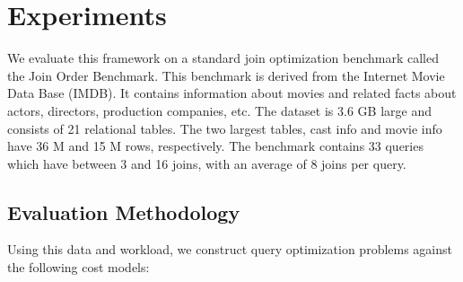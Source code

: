 \section{Experiments}
We evaluate this framework on a standard join optimization benchmark called the Join Order Benchmark. This benchmark is derived from the Internet Movie Data Base
(IMDB). It contains information
about movies and related facts about actors, directors,
production companies, etc. 
The dataset is 3.6 GB large and consists of 21 relational tables.
The two largest tables, cast info and movie info have
36 M and 15 M rows, respectively.
The benchmark contains 33 queries which have between 3 and 16 joins, with an average of 8 joins
per query. 

\subsection*{Evaluation Methodology}
Using this data and workload, we construct query optimization problems against the following cost models:

\noindent \textbf{}